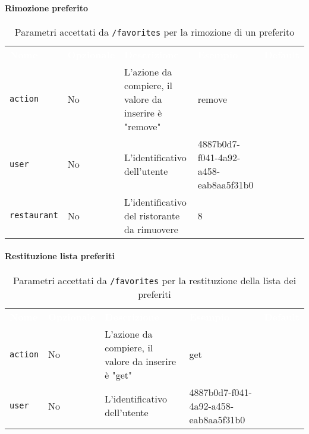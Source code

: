 \paragraph{Rimozione preferito}
\begin{table}[!htbp]
\renewcommand{\arraystretch}{1.5}
\begin{tabular}[t]{ m{}<{\centering}  m{}<{\centering} m{}<{\centering} m{}<{\centering}  m{}<{\centering} }
	\rowcolor{darkblue}
	\textcolor{white}{\textbf{Nome}} &\textcolor{white}{\textbf{Opzionale}} &\textcolor{white}{\textbf{Descrizione}} &\textcolor{white}{\textbf{Esempio}} &\textcolor{white}{\textbf{Default}} \\ 
\texttt{action} & No & L'azione da compiere, il valore da inserire è "remove"  & remove &  \\
\texttt{user} & No & L'identificativo dell'utente  & 4887b0d7-f041-4a92-a458-eab8aa5f31b0 &  \\
\texttt{restaurant} & No & L'identificativo del ristorante da rimuovere  & 8 &  \\
\end{tabular}
\caption{Parametri accettati da \texttt{/favorites} per la rimozione di un preferito}
\end{table}

\pagebreak


\paragraph{Restituzione lista preferiti}
\begin{table}[!htbp]
\renewcommand{\arraystretch}{1.5}
\begin{tabular}[t]{ m{}<{\centering}  m{}<{\centering} m{}<{\centering} m{}<{\centering}  m{}<{\centering} }
	\rowcolor{darkblue}
	\textcolor{white}{\textbf{Nome}} &\textcolor{white}{\textbf{Opzionale}} &\textcolor{white}{\textbf{Descrizione}} &\textcolor{white}{\textbf{Esempio}} &\textcolor{white}{\textbf{Default}} \\ 
\texttt{action} & No & L'azione da compiere, il valore da inserire è "get"  & get &  \\
\texttt{user} & No & L'identificativo dell'utente  & 4887b0d7-f041-4a92-a458-eab8aa5f31b0 &  \\

\end{tabular}
\caption{Parametri accettati da \texttt{/favorites} per la restituzione della lista dei preferiti}
\end{table}

